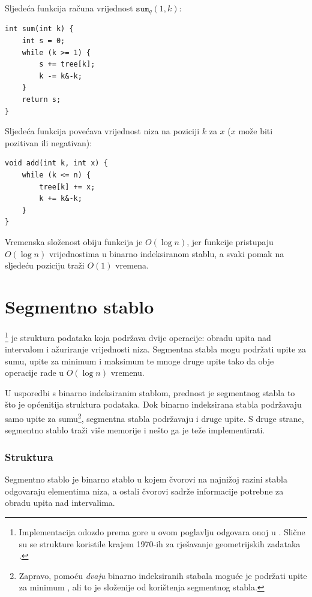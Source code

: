 Sljedeća funkcija računa vrijednost $\texttt{sum}_q(1,k)$:
\begin{lstlisting}
int sum(int k) {
    int s = 0;
    while (k >= 1) {
        s += tree[k];
        k -= k&-k;
    }
    return s;
}
\end{lstlisting}

Sljedeća funkcija povećava
vrijednost niza na poziciji $k$ za $x$
($x$ može biti pozitivan ili negativan):
\begin{lstlisting}
void add(int k, int x) {
    while (k <= n) {
        tree[k] += x;
        k += k&-k;
    }
}
\end{lstlisting}

Vremenska složenost obiju funkcija je
$O(\log n)$, jer funkcije pristupaju $O(\log n)$
vrijednostima u binarno indeksiranom stablu, a svaki pomak
na sljedeću poziciju traži $O(1)$ vremena.

\section{Segmentno stablo}


\footnote{Implementacija odozdo prema gore u ovom poglavlju odgovara
onoj u \cite{sta06}. Slične su se strukture koristile
krajem 1970-ih za rješavanje geometrijskih zadataka \cite{ben80}.} je struktura podataka
koja podržava dvije operacije:
obradu upita nad intervalom i
ažuriranje vrijednosti niza.
Segmentna stabla mogu podržati
upite za sumu, upite za minimum i maksimum te mnoge druge
upite tako da obje operacije rade u $O(\log n)$ vremenu.

U usporedbi s binarno indeksiranim stablom,
prednost je segmentnog stabla to što je
općenitija struktura podataka.
Dok binarno indeksirana stabla podržavaju samo
upite za sumu\footnote{Zapravo, pomoću \emph{dvaju} binarno
indeksiranih stabala moguće je podržati upite za minimum \cite{dim15},
ali to je složenije od korištenja segmentnog stabla.},
segmentna stabla podržavaju i druge upite.
S druge strane, segmentno stablo traži više
memorije i nešto ga je teže implementirati.

\subsubsection{Struktura}

Segmentno stablo je binarno stablo
u kojem čvorovi na najnižoj razini stabla
odgovaraju elementima niza,
a ostali čvorovi
sadrže informacije potrebne za obradu upita nad intervalima.

